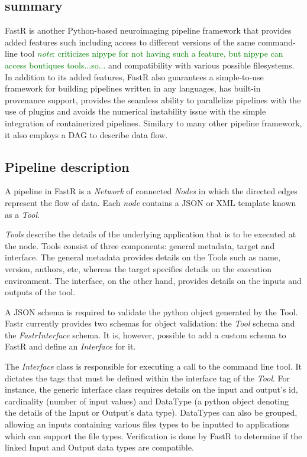 \documentclass{report}
\newcommand{\note}[1]{\textcolor{green}{\textit{note}: #1}}
\begin{document}
        \subsection{summary}
        FastR is another Python-based neuroimaging pipeline framework that
provides added features such including access to different versions of the same
command-line tool \note{criticizes nipype for not having such a feature, but
nipype can access boutiques tools...so...} and compatibility with various
possible filesystems. In addition to its added features, FastR also guarantees
a simple-to-use framework for building pipelines written in any languages, has
built-in provenance support, provides the seamless ability to parallelize
pipelines with the use of plugins and avoids the numerical instability issue with
the simple integration of containerized pipelines. Similary to many other
pipeline framework, it also employs a DAG to describe data flow.
 
        \subsection{Pipeline description}

        A pipeline in FastR is a \textit{Network} of connected \textit{Nodes} in
which the directed edges represent the flow of data.  Each \textit{node}
contains a JSON or XML template known as a \textit{Tool}. 

\textit{Tools}
describe the details of the underlying application that is to be executed at the
node. Tools consist of three components: general metadata, target and interface.
The general metadata provides details on the Tools such as name, version,
authors, etc, whereas the target specifies details on the execution environment.
The interface, on the other hand, provides details on the inputs and outputs of
the tool. 

A JSON schema is required to validate the python object generated by the Tool. 
Fastr currently provides two schemas for object validation: the \textit{Tool} schema
and the \textit{FastrInterface} schema. It is, however, possible to add a custom
schema to FastR and define an \textit{Interface} for it. 

The \textit{Interface} class is responsible for executing a call to the command line tool.
It dictates the tags that must be defined within the interface tag of the
\textit{Tool}. For instance, the generic interface class requires details on the
input and output's id, cardinality (number of input values) and DataType (a
python object denoting the details of the Input or Output's data type).
DataTypes can also be grouped, allowing an inputs containing various files types
to be inputted to applications which can support the file types.
Verification is done by FastR to determine if the linked Input and Output data
types are compatible.
\end{document}
